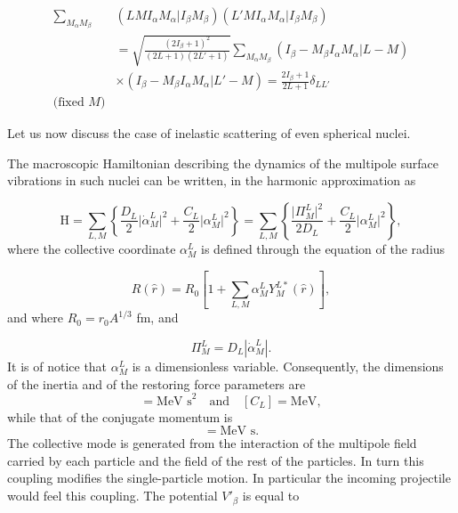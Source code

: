 \begin{subappendices}
\begin{equation}\label{eq4l10}
\begin{split}
\sum_{M_\alpha M_\beta}&(LMI_\alpha M_\alpha \vert I_\beta M_\beta)
 (L' M I_\alpha M_\alpha \vert I_\beta M_\beta)\\
& =\sqrt{\frac{(2 I_\beta+1)^2}{(2L+1)(2L'+1)}} \sum_{M_\alpha M_\beta}
(I_\beta -M_\beta  I_\alpha M_\alpha \vert L -M)\\
&\times(I_\beta -M_\beta  I_\alpha M_\alpha \vert L' -M)=\frac{2 I_\beta+1}{2 L+1} \delta_{L L'}\\
\text{(fixed $M$)}
\end{split}
\end{equation}


Let us now discuss the case of inelastic scattering of even spherical nuclei.


The macroscopic Hamiltonian describing the dynamics of the multipole surface vibrations in such nuclei can be written, in the harmonic approximation as

\begin{equation}\label{eq4l11}
\mathrm{H}=\sum_{L,M} \left\{ \frac{D_L}{2} \vert \dot{\alpha}_M^L \vert^2+
\frac{C_L}{2} \vert \alpha_M^L \vert^2 \right\}=\sum_{L,M} \left\{  \frac{\vert \Pi_M^L \vert^2}{2D_L}+
\frac{C_L}{2} \vert \alpha_M^L \vert^2 \right\},
\end{equation}
where the collective coordinate $\alpha_M^L$ is defined through the equation of the radius

\begin{equation}\label{eq4l12}
R(\hat r)= R_0 \left[1+\sum_{L,M} \alpha_M^L Y_M^{L*}(\hat r) \right],
\end{equation}
and where $R_0=r_0 A^{1/3}$ fm, and 

\begin{equation}
\Pi_M^L=D_L\left|\dot\alpha_M^L\right|.
\end{equation}
It is of notice that $\alpha_M^L$ is a dimensionless variable. Consequently, the dimensions of the inertia and of the restoring force parameters are   
\begin{equation}
[D_L]=\text{MeV s}^2\quad \text{and}\quad [C_L]=\text{MeV},
\end{equation}
while that of the conjugate momentum is 
\begin{equation}
[\Pi_M^L]=\text{MeV s}.
\end{equation}
The collective mode is generated from the interaction of the multipole field carried by each particle and the field of the rest of the particles. In turn this coupling modifies the single-particle motion. In particular the incoming projectile would feel this coupling. The potential $V'_\beta$ is equal to


\end{subappendices}
